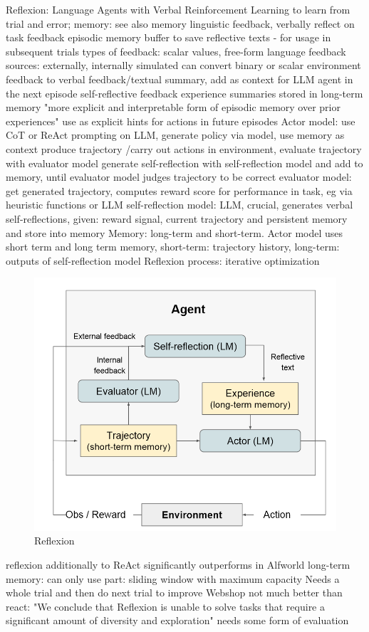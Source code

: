 \documentclass{article}
\begin{document}
\cite{shinn_reflexion_2023} Reflexion: Language Agents with Verbal Reinforcement Learning
to learn from trial and error; memory: see also memory
linguistic feedback, verbally reflect on task feedback
episodic memory buffer to save reflective texts - for usage in subsequent trials
types of feedback: scalar values, free-form language
feedback sources: externally, internally simulated
can convert binary or scalar environment feedback to verbal feedback/textual summary, add as context for LLM agent in the next episode
self-reflective feedback
experience summaries stored in long-term memory
"more explicit and interpretable form of episodic memory over prior experiences" use as explicit hints for actions in future episodes
Actor model: use CoT or ReAct prompting on LLM, generate policy via model, use memory as context
produce trajectory /carry out actions in environment, evaluate trajectory with evaluator model
generate self-reflection with self-reflection model and add to memory, until evaluator model judges trajectory to be correct
evaluator model: get generated trajectory, computes reward score for performance in task, eg via heuristic functions or LLM
self-reflection model: LLM, crucial, generates verbal self-reflections, given: reward signal, current trajectory and persistent memory and store into memory
Memory: long-term and short-term. Actor model uses short term and long term memory, short-term: trajectory history, long-term: outputs of self-reflection model
Reflexion process: iterative optimization
\begin{figure}[h]
	\centering
	\includegraphics[width=0.7\linewidth]{Reflexion.png}
	\caption{Reflexion \cite{shinn_reflexion_2023}}
	\label{fig:reflexion}
\end{figure}
reflexion additionally to ReAct significantly outperforms in Alfworld
long-term memory: can only use part: sliding window with maximum capacity
Needs a whole trial and then do next trial to improve
Webshop not much better than react: "We conclude that Reflexion is unable to solve tasks that require a significant amount of diversity and exploration"
needs some form of evaluation
\end{document}

